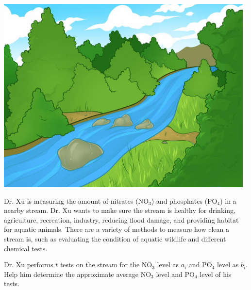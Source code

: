 \begin{center}
  \includegraphics[height=10cm]{45827.png} \\
\end{center}

Dr. Xu is measuring the amount of nitrates ($\text{NO}_3$) and phosphates ($\text{PO}_4$) in a nearby stream. Dr. Xu wants to make sure the stream is healthy for drinking, agriculture, recreation, industry, reducing flood damage, and providing habitat for aquatic animals. There are a variety of methods to measure how clean a stream is, such as evaluating the condition of aquatic wildlife and different chemical tests.


Dr. Xu performs $t$ tests on the stream for the $\text{NO}_3$ level as $a_i$ and $\text{PO}_4$ level as $b_i$. Help him determine the approximate average $\text{NO}_3$ level and $\text{PO}_4$ level of his tests.
